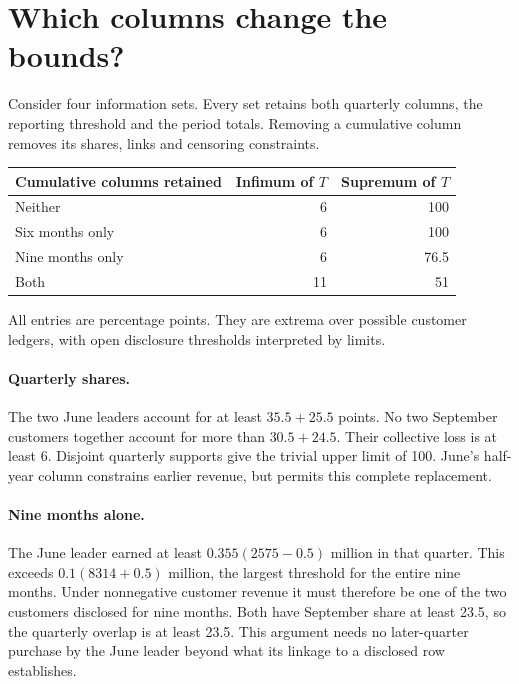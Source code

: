 \documentclass[11pt]{article}
\begin{document}
\newpage\section{Which columns change the bounds?}
Consider four information sets. Every set retains both quarterly columns, the reporting threshold and the period totals. Removing a cumulative column removes its shares, links and censoring constraints.
\begin{center}\begin{tabular}{lrr}\toprule
Cumulative columns retained & Infimum of $T$ & Supremum of $T$\\\midrule
Neither & 6 & 100\\
Six months only & 6 & 100\\
Nine months only & 6 & 76.5\\
Both & 11 & 51\\\bottomrule
\end{tabular}\end{center}
All entries are percentage points. They are extrema over possible customer ledgers, with open disclosure thresholds interpreted by limits.

\paragraph{Quarterly shares.} The two June leaders account for at least $35.5+25.5$ points. No two September customers together account for more than $30.5+24.5$. Their collective loss is at least 6. Disjoint quarterly supports give the trivial upper limit of 100. June's half-year column constrains earlier revenue, but permits this complete replacement.

\paragraph{Nine months alone.} The June leader earned at least $0.355(2575-0.5)$ million in that quarter. This exceeds $0.1(8314+0.5)$ million, the largest threshold for the entire nine months. Under nonnegative customer revenue it must therefore be one of the two customers disclosed for nine months. Both have September share at least 23.5, so the quarterly overlap is at least 23.5. This argument needs no later-quarter purchase by the June leader beyond what its linkage to a disclosed row establishes.
\end{document}
